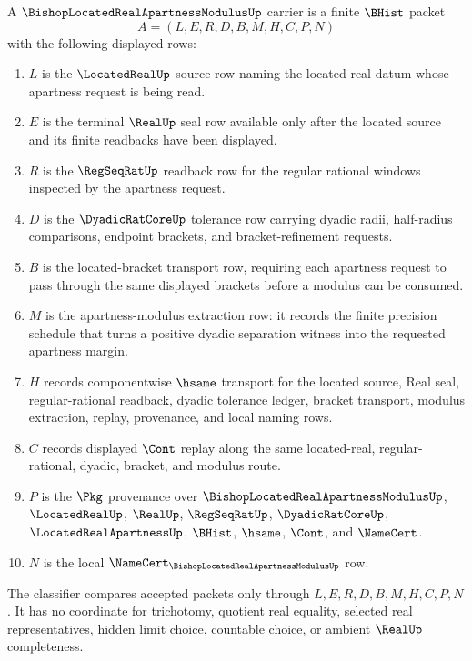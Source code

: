 \begin{definition}
\label{def:bishop-located-real-apartness-modulus-carrier}
A $\BishopLocatedRealApartnessModulusUp$ carrier is a finite $\BHist$ packet
$$
A=(L,E,R,D,B,M,H,C,P,N)
$$
with the following displayed rows:
\begin{enumerate}
\item $L$ is the $\LocatedRealUp$ source row naming the located real datum whose apartness request is being read.
\item $E$ is the terminal $\RealUp$ seal row available only after the located source and its finite readbacks have been displayed.
\item $R$ is the $\RegSeqRatUp$ readback row for the regular rational windows inspected by the apartness request.
\item $D$ is the $\DyadicRatCoreUp$ tolerance row carrying dyadic radii, half-radius comparisons, endpoint brackets, and bracket-refinement requests.
\item $B$ is the located-bracket transport row, requiring each apartness request to pass through the same displayed brackets before a modulus can be consumed.
\item $M$ is the apartness-modulus extraction row: it records the finite precision schedule that turns a positive dyadic separation witness into the requested apartness margin.
\item $H$ records componentwise $\hsame$ transport for the located source, Real seal, regular-rational readback, dyadic tolerance ledger, bracket transport, modulus extraction, replay, provenance, and local naming rows.
\item $C$ records displayed $\Cont$ replay along the same located-real, regular-rational, dyadic, bracket, and modulus route.
\item $P$ is the $\Pkg$ provenance over $\BishopLocatedRealApartnessModulusUp$, $\LocatedRealUp$, $\RealUp$, $\RegSeqRatUp$, $\DyadicRatCoreUp$, $\LocatedRealApartnessUp$, $\BHist$, $\hsame$, $\Cont$, and $\NameCert$.
\item $N$ is the local $\NameCert_{\BishopLocatedRealApartnessModulusUp}$ row.
\end{enumerate}
The classifier compares accepted packets only through $L,E,R,D,B,M,H,C,P,N$. It has no coordinate for trichotomy, quotient real equality, selected real representatives, hidden limit choice, countable choice, or ambient $\RealUp$ completeness.
\end{definition}


